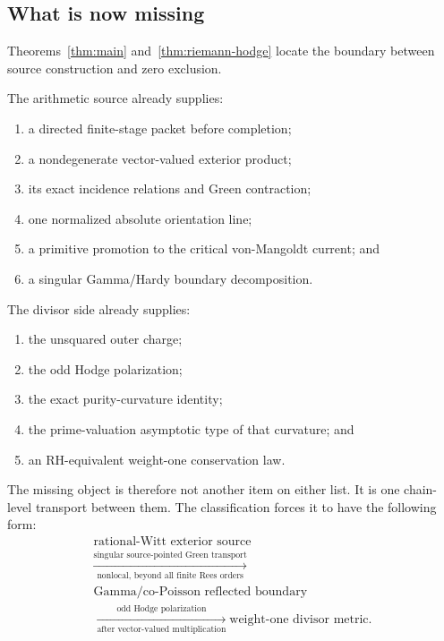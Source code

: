 \documentclass[11pt]{article}
\theoremstyle{definition}
\theoremstyle{remark}
\begin{document}
\subsection{What is now missing}

Theorems~\ref{thm:main} and~\ref{thm:riemann-hodge} locate the boundary
between source construction and zero exclusion.

The arithmetic source already supplies:

\begin{enumerate}[leftmargin=2.2em]
\item a directed finite-stage packet before completion;
\item a nondegenerate vector-valued exterior product;
\item its exact incidence relations and Green contraction;
\item one normalized absolute orientation line;
\item a primitive promotion to the critical von-Mangoldt current; and
\item a singular Gamma/Hardy boundary decomposition.
\end{enumerate}

The divisor side already supplies:

\begin{enumerate}[leftmargin=2.2em]
\item the unsquared outer charge;
\item the odd Hodge polarization;
\item the exact purity-curvature identity;
\item the prime-valuation asymptotic type of that curvature; and
\item an RH-equivalent weight-one conservation law.
\end{enumerate}

The missing object is therefore not another item on either list.  It is one
chain-level transport between them.  The classification forces it to have
the following form:
\[
\boxed{
\begin{gathered}
\text{rational-Witt exterior source}\\
\xrightarrow[\text{nonlocal, beyond all finite Rees orders}]
 {\text{singular source-pointed Green transport}}\\
\text{Gamma/co-Poisson reflected boundary}\\
\xrightarrow[\text{after vector-valued multiplication}]
 {\text{odd Hodge polarization}}
\text{weight-one divisor metric}.
\end{gathered}}
\tag{7.8}\label{eq:missing-transport}
\]
\end{document}
